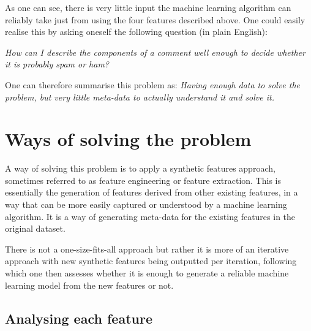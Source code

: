 As one can see, there is very little input the machine learning algorithm can reliably take just from using the four features described above. One could easily realise this by asking oneself the following question (in plain English):

\qquad \emph{How can I describe the components of a comment well enough to decide whether it is probably spam or ham?}

One can therefore summarise this problem as: \emph{Having enough data to solve the problem, but very little meta-data to actually understand it and solve it.}

\section{Ways of solving the problem}
A way of solving this problem is to apply a synthetic features approach, sometimes referred to as feature engineering or feature extraction. This is essentially the generation of features derived from other existing features, in a way that can be more easily captured or understood by a machine learning algorithm. It is a way of generating meta-data for the existing features in the original dataset.

There is not a one-size-fits-all approach but rather it is more of an iterative approach with new synthetic features being outputted per iteration, following which one then assesses whether it is enough to generate a reliable machine learning model from the new features or not.

\subsection{Analysing each feature} 

